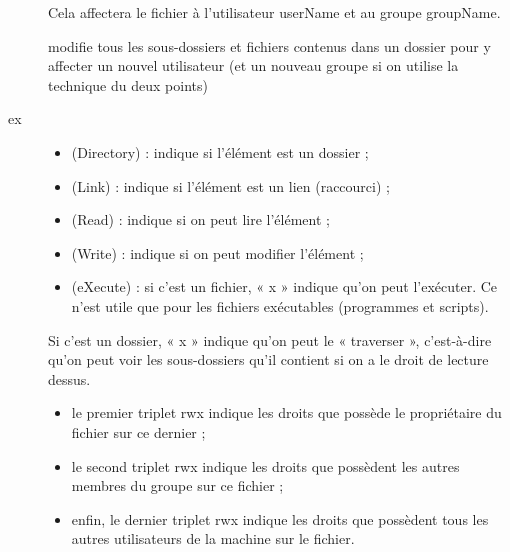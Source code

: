 \documentclass[letterpaper,10pt,french]{sphinxmanual}
\begin{document}
\begin{description}
\item[{}] \leavevmode
Cela affectera le fichier à l’utilisateur userName et au groupe groupName.

\item[{}] \leavevmode
modifie tous les sous-dossiers et fichiers contenus dans un dossier pour y affecter un nouvel utilisateur (et un nouveau groupe si on utilise la technique du deux points)

\item[{ex}] \leavevmode{[}\sphinxcode{\sphinxupquote{drwxr-xr-x 2 mateo21 mateo21 4096 2007-11-13 21:53 Desktop}}{]}\begin{itemize}
\item {} 
 (Directory) : indique si l’élément est un dossier ;

\item {} 
 (Link) : indique si l’élément est un lien (raccourci) ;

\item {} 
 (Read) : indique si on peut lire l’élément ;

\item {} 
 (Write) : indique si on peut modifier l’élément ;

\item {} 
 (eXecute) : si c’est un fichier, « x » indique qu’on peut l’exécuter. Ce n’est utile que pour les fichiers exécutables (programmes et scripts).

\end{itemize}

Si c’est un dossier, « x » indique qu’on peut le « traverser », c’est-à-dire qu’on peut voir les sous-dossiers qu’il contient si on a le droit de lecture dessus.
\begin{itemize}
\item {} 
le premier triplet rwx indique les droits que possède le propriétaire du fichier sur ce dernier ;

\item {} 
le second triplet rwx indique les droits que possèdent les autres membres du groupe sur ce fichier ;

\item {} 
enfin, le dernier triplet rwx indique les droits que possèdent tous les autres utilisateurs de la machine sur le fichier.


\end{itemize}
\end{description}
\end{document}
